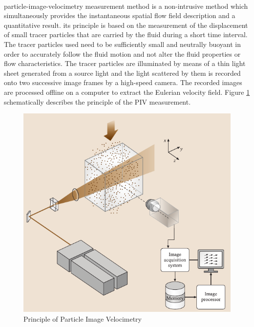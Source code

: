 \paragraph{}
particle-image-velocimetry measurement method is a non-intrusive method which simultaneously provides the instantaneous spatial flow field description and a quantitative result. its principle is based on the measurement of the displacement of small tracer particles that are carried by the fluid during a short time interval. The tracer particles used need to be sufficiently small and neutrally buoyant in order to accurately follow the fluid motion and not alter the fluid properties or flow characteristics. The tracer particles are illuminated by means of a thin light sheet generated from a source light and the light scattered by them is recorded onto two successive image frames by a high-speed camera. The recorded images are processed offline on a computer to extract the Eulerian velocity field. Figure \ref{fig:piv_principle} schematically describes the principle of the PIV measurement.
\begin{figure}[H]%
	\centering%
	\includegraphics[width=\textwidth]{figures/Chapter_1/PIV_principle.pdf}
	\caption{Principle of Particle Image Velocimetry}
	\label{fig:piv_principle}
\end{figure}
